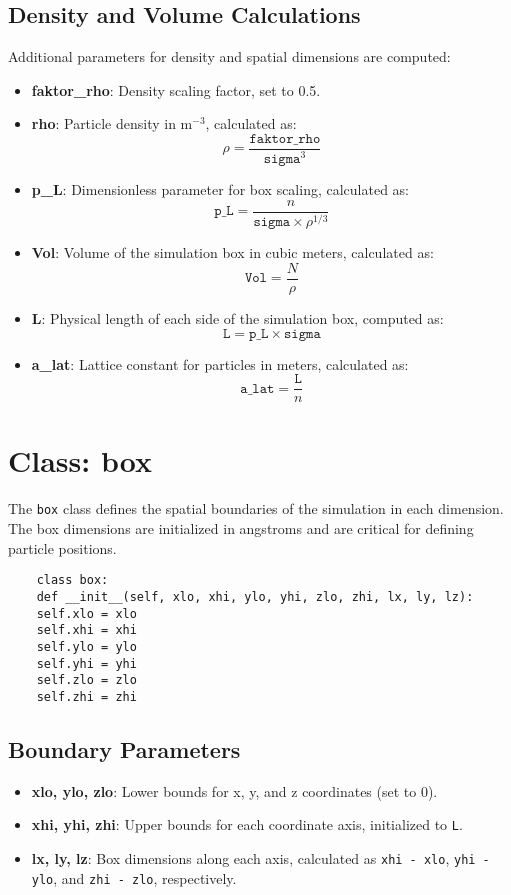 \documentclass[12pt, ngerman]{report}
\begin{document}
\subsection*{Density and Volume Calculations}

Additional parameters for density and spatial dimensions are computed:
\begin{itemize}
	\item \textbf{faktor\_rho}: Density scaling factor, set to 0.5.
	\item \textbf{rho}: Particle density in m\(^{-3}\), calculated as:
	\[
	\rho = \frac{\texttt{faktor\_rho}}{\texttt{sigma}^3}
	\]
	\item \textbf{p\_L}: Dimensionless parameter for box scaling, calculated as:
	\[
	\texttt{p\_L} = \frac{n}{\texttt{sigma} \times \rho^{1/3}}
	\]
	\item \textbf{Vol}: Volume of the simulation box in cubic meters, calculated as:
	\[
	\texttt{Vol} = \frac{N}{\rho}
	\]
	\item \textbf{L}: Physical length of each side of the simulation box, computed as:
	\[
	\texttt{L} = \texttt{p\_L} \times \texttt{sigma}
	\]
	\item \textbf{a\_lat}: Lattice constant for particles in meters, calculated as:
	\[
	\texttt{a\_lat} = \frac{\texttt{L}}{n}
	\]
\end{itemize}

\section{Class: box}
\label{sec:class_box}

The \texttt{box} class defines the spatial boundaries of the simulation in each dimension. The box dimensions are initialized in angstroms and are critical for defining particle positions.

\begin{verbatim}
	class box:
	def __init__(self, xlo, xhi, ylo, yhi, zlo, zhi, lx, ly, lz):
	self.xlo = xlo
	self.xhi = xhi
	self.ylo = ylo
	self.yhi = yhi
	self.zlo = zlo
	self.zhi = zhi
\end{verbatim}

\subsection*{Boundary Parameters}

\begin{itemize}
	\item \textbf{xlo, ylo, zlo}: Lower bounds for x, y, and z coordinates (set to 0).
	\item \textbf{xhi, yhi, zhi}: Upper bounds for each coordinate axis, initialized to \texttt{L}.
	\item \textbf{lx, ly, lz}: Box dimensions along each axis, calculated as \texttt{xhi - xlo}, \texttt{yhi - ylo}, and \texttt{zhi - zlo}, respectively.
\end{itemize}
\end{document}
